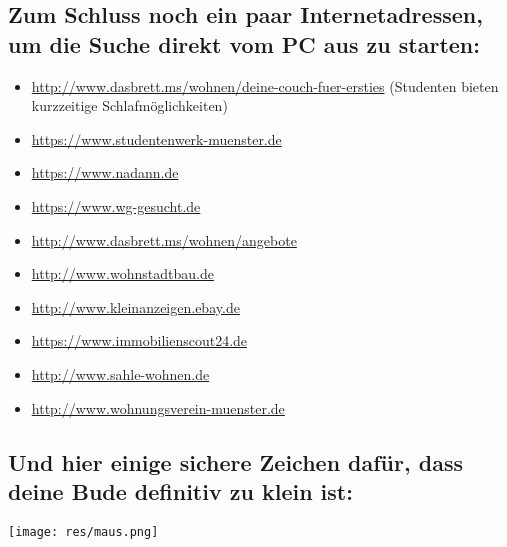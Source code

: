 \begin{multicols*}{2}
\subsection*{Zum Schluss noch ein paar Internetadressen, um die Suche direkt vom PC aus zu starten:}
\vspace{-1ex}
\begin{itemize}[leftmargin=0.8cm]
\raggedright
\item \url{http://www.dasbrett.ms/wohnen/deine-couch-fuer-ersties} (Studenten bieten kurzzeitige Schlafmöglichkeiten)
\item \url{https://www.studentenwerk-muenster.de}
\item \url{https://www.nadann.de}
\item \url{https://www.wg-gesucht.de}
\item \url{http://www.dasbrett.ms/wohnen/angebote}
\item \url{http://www.wohnstadtbau.de}
\item \url{http://www.kleinanzeigen.ebay.de}
\item \url{https://www.immobilienscout24.de}
\item \url{http://www.sahle-wohnen.de}
\item \url{http://www.wohnungsverein-muenster.de}
\end{itemize}

\vspace{-2ex}
\subsection*{Und hier einige sichere Zeichen dafür, dass deine Bude definitiv zu klein ist:}
\hspace{1.5cm}\texttt{[image: res/maus.png]}

\vspace{-\parskip}\vspace{-0.1cm}
\setlength{\fboxsep}{0.2cm}

\end{multicols*}
